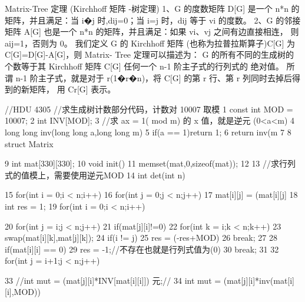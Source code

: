 \documentclass[11pt]{article}
\begin{document}
\begin{Code}
     Matrix-Tree 定理 (Kirchhoﬀ 矩阵 -树定理)
     1、G 的度数矩阵 D[G] 是一个 n*n 的矩阵，并且满足：当 i�j 时,dij=0；当 i=j 时，dij 等于
     vi 的度数。
     2、G 的邻接矩阵 A[G] 也是一个 n*n 的矩阵，并且满足：如果 vi、vj 之间有边直接相连，
     则 aij=1，否则为 0。
     我们定义 G 的 Kirchhoﬀ 矩阵 (也称为拉普拉斯算子)C[G] 为 C[G]=D[G]-A[G]，则 Matrix-
     Tree 定理可以描述为：
     G 的所有不同的生成树的个数等于其 Kirchhoﬀ 矩阵 C[G] 任何一个 n-1 阶主子式的行列式的
     绝对值。
     所谓 n-1 阶主子式，就是对于 r(1�r�n)，将 C[G] 的第 r 行、第 r 列同时去掉后得到的新矩阵，
     用 Cr[G] 表示。

     //HDU 4305
     //求生成树计数部分代码，计数对 10007 取模
 1 const int MOD = 10007;
 2 int INV[MOD];
 3 //求 ax = 1( mod m) 的 x 值，就是逆元 (0<a<m)
 4 long long inv(long long a,long long m){
 5     if(a == 1)return 1;
 6     return inv(m%
 7 }
 8 struct Matrix{
 9     int mat[330][330];
10     void init(){
11         memset(mat,0,sizeof(mat));
12     }
13     //求行列式的值模上，需要使用逆元MOD
14     int det(int n){
15         for(int i = 0;i < n;i++)
16             for(int j = 0;j < n;j++)
17                 mat[i][j] = (mat[i][j]%
18         int res = 1;
19         for(int i = 0;i < n;i++){
20             for(int j = i;j < n;j++)
21                 if(mat[j][i]!=0){
22                      for(int k = i;k < n;k++)
23                          swap(mat[i][k],mat[j][k]);
24                      if(i != j)
25                          res = (-res+MOD)%
26                      break;
27                 }
28             if(mat[i][i] == 0){
29                 res = -1;//不存在也就是行列式值为(0)
30                 break;
31             }
32             for(int j = i+1;j < n;j++){
33                 //int mut = (mat[j][i]*INV[mat[i][i]])%
                      元;//
34                 int mut = (mat[j][i]*inv(mat[i][i],MOD))%


}}}}
\end{Code}
\end{document}
